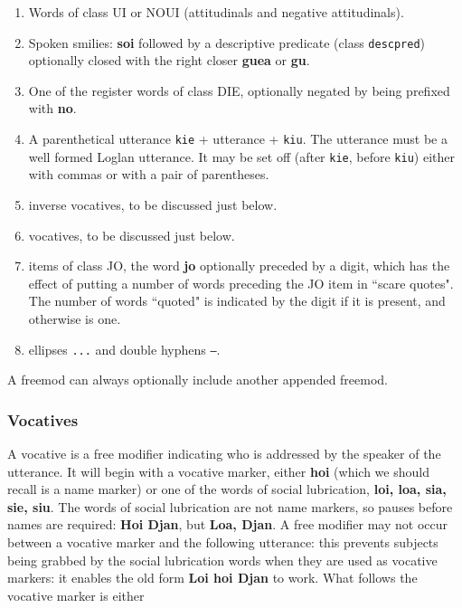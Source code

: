 \documentclass[12pt]{book}
\begin{document}
{\begin{enumerate}

\item  Words of class UI or NOUI (attitudinals and negative attitudinals).

\item  Spoken smilies:  {\bf soi} followed by a descriptive predicate (class {\tt descpred}) optionally closed with the right closer {\bf guea} or {\bf gu}.

\item  One of the register words of class DIE, optionally negated by being prefixed with {\bf no}.

\item  A parenthetical utterance {\tt kie} + utterance + {\tt kiu}.  The utterance must be a well formed Loglan utterance.  It may be set off (after {\tt kie}, before {\tt kiu}) either with commas or with a pair of parentheses.

\item inverse vocatives, to be discussed just below.

\item  vocatives, to be discussed just below.

\item  items of class JO, the word {\bf jo} optionally preceded by a digit, which has the effect of putting a number of words preceding the JO item in ``scare quotes".  The number of words ``quoted" is indicated by the digit if it is present, and otherwise is one.

\item ellipses {\tt ...} and double hyphens {\tt --}.

\end{enumerate}

A freemod can always optionally include another appended freemod.

\subsubsection{Vocatives}

A vocative is a free modifier indicating who is addressed by the speaker of the utterance.  It will begin with a vocative marker, either
{\bf hoi} (which we should recall is a name marker) or one of the words of social lubrication, {\bf loi, loa, sia, sie, siu}.  The words of social lubrication are not name markers, so pauses before names are required:  {\bf Hoi Djan}, but {\bf Loa, Djan}.  A free modifier may not occur between a vocative marker and the following utterance:  this prevents subjects being grabbed by the social lubrication words when they are used as vocative markers:  it enables the old form {\bf Loi hoi Djan} to work.  What follows the vocative marker is either 

}
\end{document}
